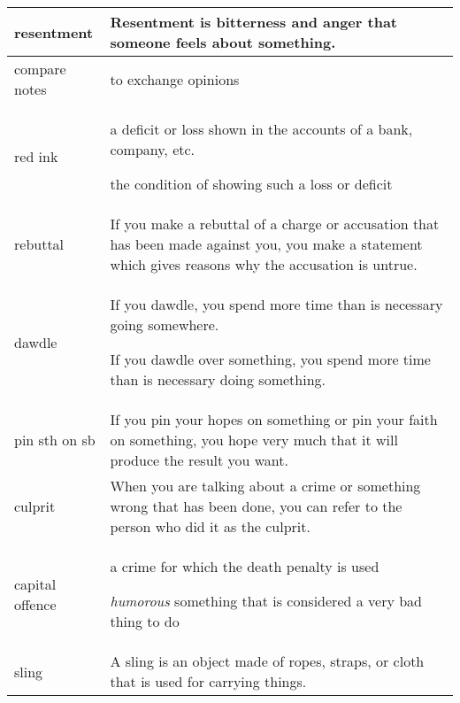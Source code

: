 \documentclass{article}
\begin{document}
\begin{center}
\begin{longtable}{|l|p{9cm}|}
\hline
resentment
&
Resentment is bitterness and anger that someone feels about something.
\\

\hline
compare notes
&
to exchange opinions
\\

\hline
red ink
&
a deficit or loss shown in the accounts of a bank, company, etc.
\par
the condition of showing such a loss or deficit
\\

\hline
rebuttal
&
If you make a rebuttal of a charge or accusation that has been made against you, you make a statement which gives reasons why the accusation is untrue.
\\

\hline
dawdle
&
If you dawdle, you spend more time than is necessary going somewhere.
\par
If you dawdle over something, you spend more time than is necessary doing something.
\\

\hline
pin sth on sb
&
If you pin your hopes on something or pin your faith on something, you hope very much that it will produce the result you want.
\\

\hline
culprit
&
When you are talking about a crime or something wrong that has been done, you can refer to the person who did it as the culprit.
\\

\hline
capital offence
&
a crime for which the death penalty is used
\par
\textit{humorous} something that is considered a very bad thing to do
\\

\hline
sling
&
A sling is an object made of ropes, straps, or cloth that is used for carrying things.
\\

\end{longtable}
\end{center}
\end{document}
